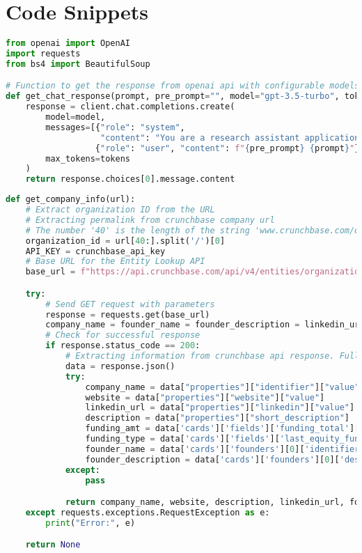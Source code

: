 \documentclass[a4paper,11pt]{article}
\begin{document}
\section{Code Snippets}
\begin{lstlisting}[language=Python, caption=OpenAI Api integration]
from openai import OpenAI
import requests
from bs4 import BeautifulSoup

# Function to get the response from openai api with configurable models and tokens
def get_chat_response(prompt, pre_prompt="", model="gpt-3.5-turbo", tokens=500):
    response = client.chat.completions.create(
        model=model,
        messages=[{"role": "system",
                   "content": "You are a research assistant application whose purpose is to provide results for queries to the user. You only provide the answers without any explanations and introductions. For all the questions asked, return only the required values without other text."},
                  {"role": "user", "content": f"{pre_prompt} {prompt}"}],
        max_tokens=tokens
    )
    return response.choices[0].message.content
\end{lstlisting}
\pagebreak
\begin{lstlisting}[language=Python, caption=Extracting Information using crunchbase api]
def get_company_info(url):
    # Extract organization ID from the URL
    # Extracting permalink from crunchbase company url
    # The number '40' is the length of the string 'www.crunchbase.com/organization'
    organization_id = url[40:].split('/')[0]
    API_KEY = crunchbase_api_key
    # Base URL for the Entity Lookup API
    base_url = f"https://api.crunchbase.com/api/v4/entities/organizations/{organization_id}?card_ids=founders,fields&field_ids=website,linkedin,short_description&user_key={API_KEY}"

    try:
        # Send GET request with parameters
        response = requests.get(base_url)
        company_name = founder_name = founder_description = linkedin_url = website = description = funding_amt = funding_type = None
        # Check for successful response
        if response.status_code == 200:
            # Extracting information from crunchbase api response. Fully customisable to extract relevant information
            data = response.json()
            try:
                company_name = data["properties"]["identifier"]["value"]
                website = data["properties"]["website"]["value"]
                linkedin_url = data["properties"]["linkedin"]["value"]
                description = data["properties"]["short_description"]
                funding_amt = data['cards']['fields']['funding_total']['value_usd']
                funding_type = data['cards']['fields']['last_equity_funding_type']
                founder_name = data['cards']['founders'][0]['identifier']['value']
                founder_description = data['cards']['founders'][0]['description']
            except:
                pass

            return company_name, website, description, linkedin_url, founder_name, founder_description, funding_amt, funding_type
    except requests.exceptions.RequestException as e:
        print("Error:", e)

    return None
\end{lstlisting}
\end{document}
